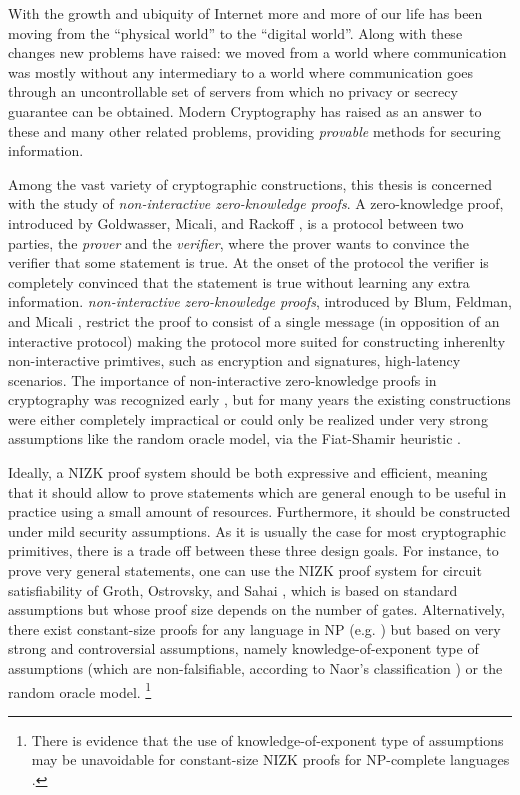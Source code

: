 With the growth and ubiquity of Internet more and more of our life has been moving from the ``physical world'' to the ``digital world''. Along with these changes new problems have raised: we moved from a world where communication was mostly without any intermediary to a world where communication goes through an uncontrollable set of servers from which no privacy or secrecy guarantee can be obtained. Modern Cryptography has raised as an answer to these and many other related problems, providing \emph{provable} methods for securing information.  

Among the vast variety of cryptographic constructions, this thesis is concerned with the study of \emph{non-interactive  zero-knowledge proofs}.
A zero-knowledge proof, introduced by Goldwasser, Micali, and Rackoff \cite{GolMicRac89}, is a protocol between two parties, the \emph{prover} and the \emph{verifier}, where the prover wants to convince the verifier that some statement is true. At the onset of the protocol the verifier is completely convinced that the statement is true without learning any extra information. \emph{non-interactive  zero-knowledge proofs}, introduced by Blum, Feldman, and Micali \cite{STOC:BluFelMic88}, restrict the proof to consist of a single message (in opposition of an interactive protocol) making the protocol more suited for constructing inherenlty non-interactive primtives, such as encryption and signatures,  high-latency scenarios.
The importance of non-interactive zero-knowledge proofs in cryptography was recognized early \cite{STOC:NaoYun90,STOC:DolDwoNao91,CCS:BelRog93}, but for many years the existing constructions were either completely impractical or could only be realized under very strong assumptions like the random oracle model, via the Fiat-Shamir heuristic \cite{C:FiaSha86}. 

Ideally, a NIZK proof system should be both expressive and efficient, meaning that it should allow to prove
statements which are general enough to be useful in practice using a small amount of resources.
Furthermore, it should be constructed under
mild security assumptions.
As it is usually the case for most cryptographic primitives, there is a trade off between these three design goals.
For instance,
to prove very general statements, one can use the NIZK proof 
system for circuit satisfiability of Groth, Ostrovsky, and Sahai 
\cite{EC:GroOstSah06}, which is based on standard assumptions but 
whose proof size depends on the number of gates. 
Alternatively,
there exist constant-size proofs for any language in NP
  (e.g. \cite{EC:GGPR13}) but based on very strong and controversial assumptions, 
  namely knowledge-of-exponent type of assumptions 
  (which are non-falsifiable, according to Naor's classification 
  \cite{C:Naor03}) or the random oracle model. 
\footnote{There is evidence that the use of knowledge-of-exponent type of  assumptions 
may be unavoidable for constant-size NIZK proofs for NP-complete languages \cite{STOC:GenWic11}.}

